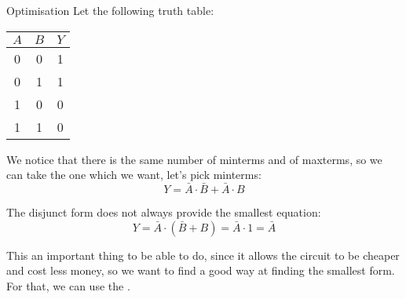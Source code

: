 \documentclass[a4paper]{article}
\begin{document}
\begin{parag}{Optimisation}
    Let the following truth table: 
    \begin{center}
        \begin{tabular}{c|c|c}
            $A$ & $B$ & $Y$ \\
            \hline
            0 & 0 & 1 \\
            0 & 1 & 1 \\
            1 & 0 & 0 \\
            1 & 1 & 0 \\
        \end{tabular}
    \end{center}
    

    We notice that there is the same number of minterms and of maxterms, so we can take the one which we want, let's pick minterms: 
    \[Y = \bar{A} \cdot \bar{B} + \bar{A} \cdot B\]
    
    The disjunct form does not always provide the smallest equation: 
    \[Y = \bar{A} \cdot \left(\bar{B} + B\right) = \bar{A} \cdot 1 = \bar{A}\]

    This an important thing to be able to do, since it allows the circuit to be cheaper and cost less money, so we want to find a good way at finding the smallest form. For that, we can use the .
\end{parag}
\end{document}
